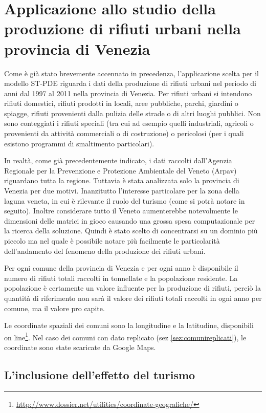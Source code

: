 \documentclass[a4paper,11pt,twoside,openright]{book}							%
\begin{document}
\chapter{Applicazione allo studio della produzione di rifiuti urbani nella provincia di Venezia}
\label{cap:rifiuti}

Come è già stato brevemente accennato in precedenza, l'applicazione scelta per il modello ST-PDE riguarda i dati della produzione di rifiuti urbani nel periodo di anni dal 1997 al 2011 nella provincia di Venezia. Per rifiuti urbani si intendono rifiuti domestici, rifiuti prodotti in locali, aree pubbliche, parchi, giardini o spiagge, rifiuti provenienti dalla pulizia delle strade o di altri luoghi pubblici. Non sono conteggiati i rifiuti speciali (tra cui ad esempio quelli industriali, agricoli o provenienti da attività commerciali o di costruzione) o pericolosi (per i quali esistono programmi di smaltimento particolari).

In realtà, come già precedentemente indicato, i dati raccolti dall'Agenzia Regionale per la Prevenzione e Protezione Ambientale del Veneto (Arpav) riguardano tutta la regione. Tuttavia è stata analizzata solo la provincia di Venezia per due motivi. Inanzitutto l'interesse particolare per la zona della laguna veneta, in cui è rilevante il ruolo del turismo (come si potrà notare in seguito). Inoltre considerare tutto il Veneto aumenterebbe notevolmente le dimensioni delle matrici in gioco causando una grossa spesa computazionale per la ricerca della soluzione. Quindi è stato scelto di concentrarsi su un dominio più piccolo ma nel quale è possibile notare più facilmente le particolarità dell'andamento del fenomeno della produzione dei rifiuti urbani.

Per ogni comune della provincia di Venezia e per ogni anno è disponibile il numero di rifiuti totali raccolti in tonnellate e la popolazione residente. La popolazione è certamente un valore influente per la produzione di rifiuti, perciò la quantità di riferimento non sarà il valore dei rifiuti totali raccolti in ogni anno per comune, ma il valore pro capite.

Le coordinate spaziali dei comuni sono la longitudine e la latitudine, disponibili on line\footnote{\href{http://www.dossier.net/utilities/coordinate-geografiche/}{http://www.dossier.net/utilities/coordinate-geografiche/}}. Nel caso dei comuni con dato replicato (sez \ref{sez:comunireplicati}), le coordinate sono state scaricate da Google Maps.


\section{L'inclusione dell'effetto del turismo}
\end{document}
